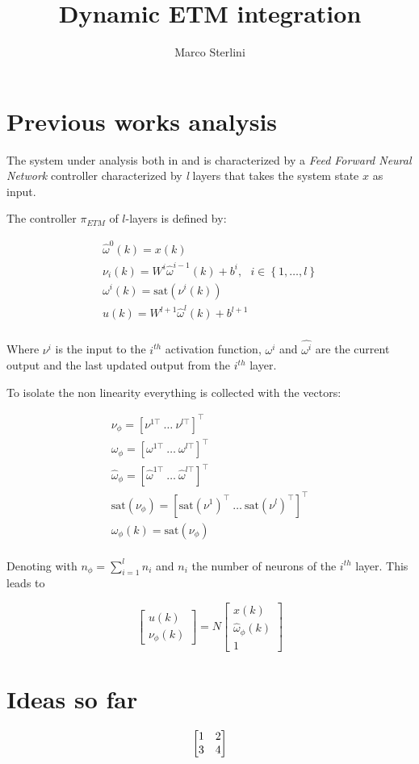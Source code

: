 \documentclass[12pt]{article}
\begin{document}
\date{}
\author{Marco Sterlini}

\title{Dynamic ETM integration}
\maketitle

\section*{Previous works analysis}
The system under analysis both in \cite{css-paper} and \cite{css-extended} is characterized by a \textit{Feed Forward Neural Network} controller characterized by \textit{l} layers that takes the system state $x$ as input.

The controller $\pi_{ETM}$ of $l$-layers is defined by:

\begin{multline}
  \hat{\omega}^{0}(k) = x(k)\\
  \nu_i(k) = W^{i} \hat{\omega}^{i-1}(k) + b^i,\ \ \ i \in \left\{ 1, \dots, l \right\}\\
  \omega^i(k) = \text{sat}(\nu^i(k))\\
  u(k) = W^{l+1} \hat{\omega}^{l}(k) + b^{l+1}\\
\end{multline}

Where $\nu^{i}$ is the input to the $i^{th}$ activation function, $\omega^i$ and $\hat{\omega^i}$ are the current output and the last updated output from the $i^{th}$ layer.

To isolate the non linearity everything is collected with the vectors:

\begin{multline*}
  \nu_{\phi} = [\nu^{1 \top}\ \dots \ \nu^{l \top}]^{\top}\\
  \omega_{\phi} = [\omega^{1 \top}\ \dots \ \omega^{l \top}]^{\top}\\
  \hat{\omega}_{\phi} = [\hat{\omega}^{1 \top}\ \dots \ \hat{\omega}^{l \top}]^{\top}\\
  \text{sat}(\nu_{\phi}) = [\text{sat}(\nu^{1})^{\top}\ \dots \ \text{sat}(\nu^{l})^{\top}]^{\top}\\
  \omega_{\phi}(k) = \text{sat}(\nu_{\phi})\\
\end{multline*}

Denoting with $n_{\phi} = \sum_{i=1}^{l} n_{i}$ and $n_{i}$ the number of neurons of the $i^{th}$ layer. This leads to 

\begin{equation}
  \begin{bmatrix}
    u(k)\\
    \nu_{\phi}(k)
  \end{bmatrix} = N \begin{bmatrix}
    x(k)\\
    \hat{\omega}_{\phi}(k)\\
    1
  \end{bmatrix}
\end{equation}

\section*{Ideas so far}

\begin{equation}
  \left[\begin{matrix}1 & 2\\ 3 & 4\end{matrix}\right]
\end{equation}
\pagebreak
\printbibliography
\end{document}
